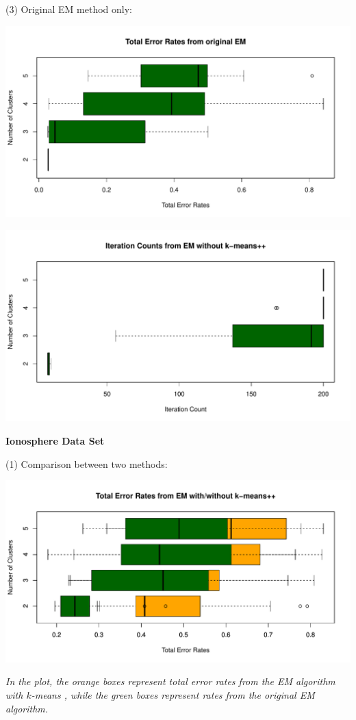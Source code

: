 \documentclass[a4paper,12pt]{article}
\newcommand{\km}{$k$-means }
\begin{document}
\noindent (3) Original EM method only:
\begin{center}
  \includegraphics[width=0.8\linewidth]{Image/ProbEC1-TotalErr-Ringnorm-EM.pdf}
\end{center}
\begin{center}
  \includegraphics[width=0.8\linewidth]{Image/ProbEC1-ItrCount-Ringnorm-EM.pdf}
\end{center}







\bigskip
\begin{center}
    \textcolor{mydarkgreen}{\textbf{Ionosphere Data Set}}
\end{center}

\noindent (1) Comparison between two methods:

\begin{center}
  \includegraphics[width=0.9\linewidth]{Image/ProbEC1-TotalErr-Ionosphere-Both.pdf}
  
   \parbox{0.9\textwidth}{\textit{In the plot, the \textcolor{myorange}{orange boxes} represent total error rates from the EM algorithm with \km, while the \textcolor{mydarkgreen}{green boxes} represent rates from the original EM algorithm.
  }}
\end{center}
\bigskip
\end{document}
